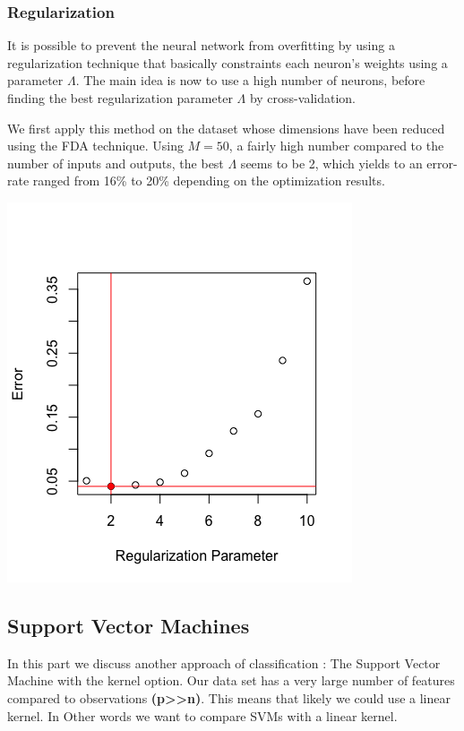 \documentclass[]{report}
\begin{document}
\subsubsection{Regularization}
 It is possible to prevent the neural network from overfitting by using a regularization technique that basically constraints each neuron's weights using a parameter $\Lambda$. The main idea is now to use a high number of neurons, before finding the best regularization parameter  $\Lambda$ by cross-validation.
 
 We first apply this method on the dataset whose dimensions have been reduced using the FDA technique. Using $M = 50$, a fairly high number compared to the number of inputs and outputs, the best $\Lambda$ seems to be 2, which yields to an error-rate ranged from 16\% to 20\% depending on the optimization results.
 
 \begin{center}
 	\includegraphics[width=0.6\linewidth]{Figures/nnet_fda_reg_cv.png}
 	\label{fig:nnet_fda_reg_cv}
 \end{center}


 
\pagebreak
\subsection{Support Vector Machines}
In this part we discuss another approach of classification : The Support Vector Machine with the kernel option. Our data set has a very large number of features compared to observations \textbf{(p>>n)}. This means that likely we could use a linear kernel. In Other words we want to compare SVMs with a linear kernel.
\end{document}
